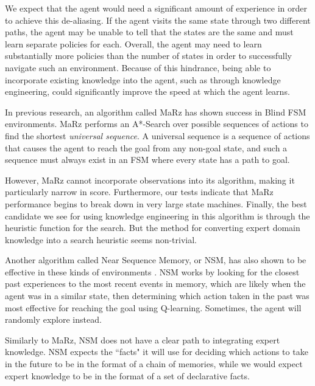\documentclass[letterpaper]{article} %
\begin{document}
We expect that the agent would need a significant amount of experience in order to achieve this de-aliasing. If the agent visits the same state through two different paths, the agent may be unable to tell that the states are the same and must learn separate policies for each. Overall, the agent may need to learn substantially more policies than the number of states in order to successfully navigate such an environment. Because of this hindrance, being able to incorporate existing knowledge into the agent, such as through knowledge engineering, could significantly improve the speed at which the agent learns.

In previous research, an algorithm called MaRz \cite{Rodriguez17} has
shown success in Blind FSM environments.  MaRz performs an
A*-Search \cite{Russell09}over possible sequences of actions to find
the shortest \textit{universal sequence}.  A universal sequence is a
sequence of actions that causes the agent to reach the goal from any
non-goal state, and such a sequence must always exist in an FSM where every state has a path to goal.

However, MaRz cannot incorporate observations into its algorithm, making it particularly narrow in score. Furthermore, our tests indicate that MaRz performance begins to break down in very large state machines. Finally, the best candidate we see for using knowledge engineering in this algorithm is through the heuristic function for the search. But the method for converting expert domain knowledge into a search heuristic seems non-trivial.

Another algorithm called Near Sequence Memory, or NSM, has also shown to be effective in these kinds of environments \cite{McCallum95}. NSM works by looking for the closest past experiences to the most recent events in memory, which are likely when the agent was in a similar state, then determining which action taken in the past was most effective for reaching the goal using Q-learning. Sometimes, the agent will randomly explore instead.

Similarly to MaRz, NSM does not have a clear path to integrating expert knowledge. NSM expects the ``facts" it will use for deciding which actions to take in the future to be in the format of a chain of memories, while we would expect expert knowledge to be in the format of a set of declarative facts.
\end{document}
